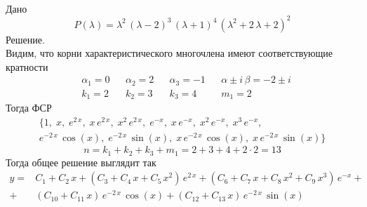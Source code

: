 \begin{Example}~\\
    Дано
    \[
        P(\lambda) = \lambda^2\,(\lambda - 2)^3\,(\lambda + 1)^4\,(\lambda^2 + 2\,\lambda + 2)^2 
    \]
    Решение.\\
    Видим, что корни характеристического многочлена имеют соответствующие кратности
    \begin{align*}
        &\alpha_1 = 0& &\alpha_2 = 2& &\alpha_3 = -1& &\alpha \pm i\,\beta = -2 \pm i\\
        &k_1 = 2& &k_2 = 3& &k_3 = 4& &m_1 = 2
    \end{align*}
    Тогда ФСР
    \begin{multline*}
        \{1,\; x,\; e^{2\,x},\; x\,e^{2\,x},\; x^2\,e^{2\,x},\; e^{-x},\; x\,e^{-x},\; x^2\,e^{-x},\; x^3\,e^{-x},\;\\
        e^{-2\,x}\,\cos(x),\; e^{-2\,x}\,\sin(x),\;  x\,e^{-2\,x}\,\cos(x),\; x\,e^{-2\,x}\,\sin(x)\}
    \end{multline*}
    \[
        n = k_1 + k_2 + k_3 + m_1 = 2 + 3 + 4 + 2\cdot2 = 13
    \]
    Тогда общее решение выглядит так
    \begin{align*}
        y = &C_1 + C_2\,x + (C_3 + C_4\,x + C_5\,x^2)\,e^{2\,x} + (C_6 + C_7\,x + C_8\,x^2 + C_9\,x^3)\,e^{-x} + \\
        + &(C_{10} + C_{11}\,x)\,e^{-2\,x}\,\cos(x) + (C_{12} + C_{13}\,x)\,e^{-2\,x}\,\sin(x)
    \end{align*}
\end{Example}